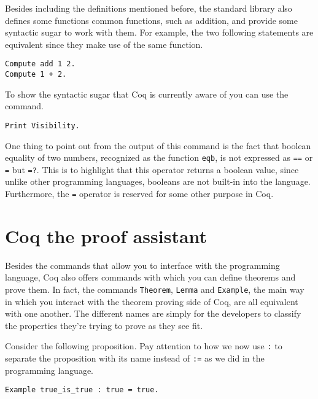 Besides including the definitions mentioned before, the standard library also defines some functions 
common functions, such as addition, and provide some syntactic sugar to work with them. For example, the
two following statements are equivalent since they make use of the same function.

\begin{verbatim}
Compute add 1 2.
Compute 1 + 2.
\end{verbatim}

To show the syntactic sugar that Coq is currently aware of you can use the command. 

\begin{verbatim}
Print Visibility.
\end{verbatim}

One thing to point out from the output of this command is the fact that boolean equality of two numbers,
recognized as the function \texttt{eqb}, is not expressed as \texttt{==} or 
\texttt{=} but \texttt{=?}. This is to highlight that this operator returns a boolean
value, since unlike other programming languages, booleans are not built-in into the language. Furthermore,
the \texttt{=} operator is reserved for some other purpose in Coq.

\section{Coq the proof assistant}
\label{sect:coq-proof-assistant}


Besides the commands that allow you to interface with the programming language, Coq also offers commands
with which you can define theorems and prove them. In fact, the commands \texttt{Theorem}, 
\texttt{Lemma} and \texttt{Example}, the main way in which you interact with the 
theorem proving side of Coq, are all equivalent with one another. The different names are simply for the 
developers to classify the properties they're trying to prove as they see fit.

Consider the following proposition. Pay attention to how we now use \texttt{:} to separate the 
proposition with its name instead of \texttt{:=} as we did in the programming language.

\begin{verbatim}
Example true_is_true : true = true.
\end{verbatim}


